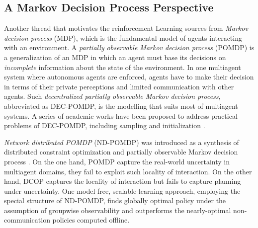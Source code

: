 \documentclass[conference]{IEEEtran}
\begin{document}
\subsection{A Markov Decision Process Perspective}
Another thread that motivates the reinforcement Learning sources from 
\textit{Markov decision process} (MDP), which is the fundamental model of
agents interacting with an environment.
A \textit{partially observable Markov decision process}
(POMDP) is a generalization of an MDP in which an agent must base its
decisions on \textit{incomplete} information about the state of the environment. 
In one multiagent system where autonomous agents are enforced, agents have to
make their decision in terms of their private perceptions and limited
communication with other agents. Such \textit{decentralized partially
    observable Markov decision process}, abbreviated as DEC-POMDP, is the
modelling that suits most of multiagent systems. A series of academic works
have been proposed to address practical problems of DEC-POMDP, including
sampling \cite{banerjee2012sample} and initialization
\cite{kraemer2012informed}. 

\textit{Network distributed POMDP} (ND-POMDP) was introduced as a synthesis of
 distributed constraint optimization and partially observable Markov decision
 process \cite{nair2005networked}. On the one hand, POMDP capture the
 real-world uncertainty in multiagent domains, they fail to exploit such
 locality of interaction. On the other hand, DCOP captures the locality of
 interaction but fails to capture planning under uncertainty.
One model-free, scalable learning approach, employing the special structure
of ND-POMDP, finds globally optimal policy under the assumption
of groupwise observability and outperforms the nearly-optimal
non-communication policies computed offline\cite{zhang2011coordinated}. 
\end{document}
